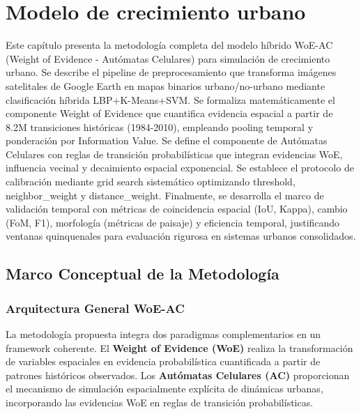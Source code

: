 
\chapter{Modelo de crecimiento urbano}
\label{ch:modelo-crecimiento-urbano}


\begin{resumen}
Este capítulo presenta la metodología completa del modelo híbrido WoE-AC (Weight of Evidence - Autómatas Celulares) para simulación de crecimiento urbano. Se describe el pipeline de preprocesamiento que transforma imágenes satelitales de Google Earth en mapas binarios urbano/no-urbano mediante clasificación híbrida LBP+K-Means+SVM. Se formaliza matemáticamente el componente Weight of Evidence que cuantifica evidencia espacial a partir de 8.2M transiciones históricas (1984-2010), empleando pooling temporal y ponderación por Information Value. Se define el componente de Autómatas Celulares con reglas de transición probabilísticas que integran evidencias WoE, influencia vecinal y decaimiento espacial exponencial. Se establece el protocolo de calibración mediante grid search sistemático optimizando threshold, neighbor\_weight y distance\_weight. Finalmente, se desarrolla el marco de validación temporal con métricas de coincidencia espacial (IoU, Kappa), cambio (FoM, F1), morfología (métricas de paisaje) y eficiencia temporal, justificando ventanas quinquenales para evaluación rigurosa en sistemas urbanos consolidados.
\end{resumen}

\section{Marco Conceptual de la Metodología}

\subsection{Arquitectura General WoE-AC}

La metodología propuesta integra dos paradigmas complementarios en un framework coherente. El \textbf{Weight of Evidence (WoE)} realiza la transformación de variables espaciales en evidencia probabilística cuantificada a partir de patrones históricos observados. Los \textbf{Autómatas Celulares (AC)} proporcionan el mecanismo de simulación espacialmente explícita de dinámicas urbanas, incorporando las evidencias WoE en reglas de transición probabilísticas.

